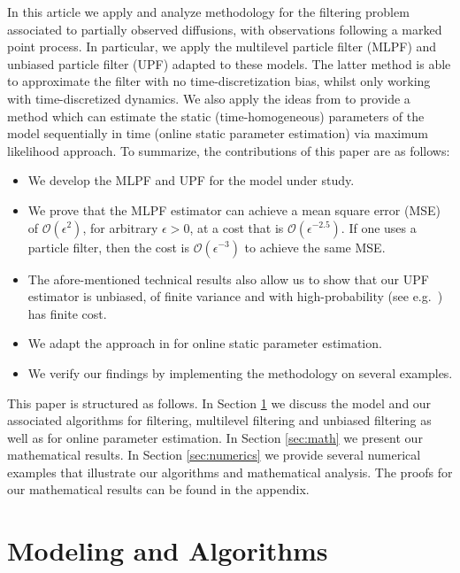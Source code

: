 \documentclass[english]{article}
\begin{document}
In this article we apply and analyze methodology for  the filtering problem associated to partially observed diffusions, with observations following a marked point process. In particular,
we apply the multilevel particle filter (MLPF) \cite{mlpf} and unbiased particle filter (UPF) \cite{ub_pf} adapted to these models. The latter method is able to approximate the filter with no time-discretization bias, whilst only working with time-discretized dynamics. We also apply the ideas from \cite{beskos} to provide a method which can estimate the static (time-homogeneous) parameters of the model sequentially in time (online static parameter estimation) via maximum likelihood approach. To summarize, the contributions of this paper are as follows:
\begin{itemize}
\item{We develop the MLPF and UPF for the model under study.}
\item{We prove that the MLPF estimator can achieve a mean square error (MSE) of $\mathcal{O}(\epsilon^2)$, for arbitrary $\epsilon>0$, at a cost that is $\mathcal{O}(\epsilon^{-2.5})$.
If one uses a particle filter, then the cost is $\mathcal{O}(\epsilon^{-3})$ to achieve the same MSE.}
\item{The afore-mentioned technical results also allow us to show that our UPF estimator is unbiased, of finite variance and with high-probability (see e.g.~\cite{rhee}) has finite cost.}
\item{We adapt the approach in \cite{beskos} for online static parameter estimation.}
\item{We verify our findings by  implementing the methodology on several examples.}
\end{itemize}

This paper is structured as follows. In Section \ref{sec:model} we discuss the model and our associated algorithms for filtering, multilevel filtering and unbiased filtering as well as for online parameter estimation. In Section \ref{sec:math} we present our mathematical results. In Section \ref{sec:numerics} we provide several numerical examples that illustrate our algorithms and mathematical analysis. The proofs for our mathematical results can be found in the appendix.

\section{Modeling and Algorithms}\label{sec:model}
\end{document}
